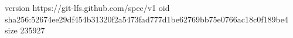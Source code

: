 version https://git-lfs.github.com/spec/v1
oid sha256:52674ee29df454b31320f2a5473fad777d1be62769bb75e0766ac18c0f189be4
size 235927
